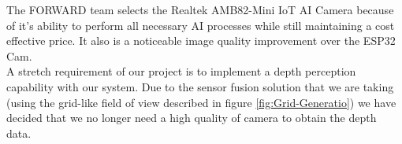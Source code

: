 \begin{table}[H]
	\centering
	\setlength{\tabcolsep}{5pt} %
	\renewcommand{\arraystretch}{1.75} %
	\caption{\label{fig:compareCameras}Comparison of Camera Modules for ESP32-based Applications}
\end{table}

\noindent The FORWARD team selects the Realtek AMB82-Mini IoT AI Camera because of it's ability to perform all necessary AI processes while still maintaining a cost effective price. It also is a noticeable image quality improvement over the ESP32 Cam. \\

\noindent A stretch requirement of our project is to implement a depth perception capability with our system. Due to the sensor fusion solution that we are taking (using the grid-like field of view described in figure \ref{fig:Grid-Generatio}) we have decided that we no longer need a high quality of camera to obtain the depth data. \\

